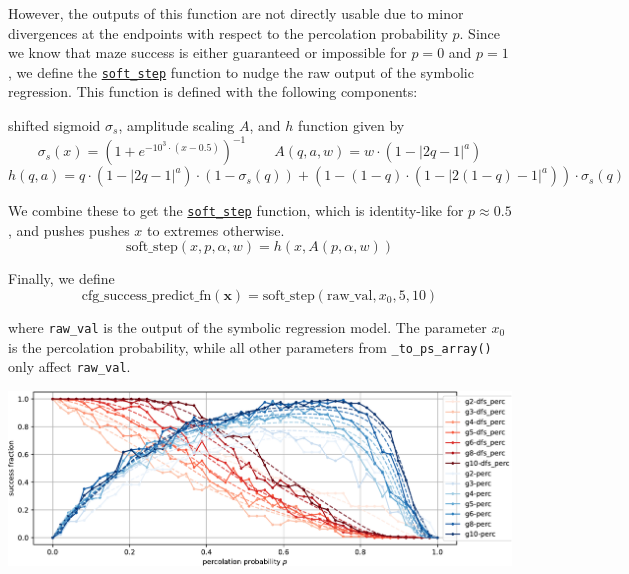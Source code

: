 \documentclass[10pt,a4paper,onecolumn]{article}
\let\origfigure\figure
\let\endorigfigure\endfigure
\renewenvironment{figure}[1][2] {
    \expandafter\origfigure\expandafter[H]
} {
    \endorigfigure
}
\begin{document}
However, the outputs of this function are not directly usable due to
minor divergences at the endpoints with respect to the percolation
probability \(p\). Since we know that maze success is either guaranteed
or impossible for \(p=0\) and \(p=1\), we define the
\href{https://understanding-search.github.io/maze-dataset/maze_dataset/dataset/success_predict_math.html\#soft_step}{\texttt{soft\_step}}
function to nudge the raw output of the symbolic regression. This
function is defined with the following components:

shifted sigmoid \(\sigma_s\), amplitude scaling \(A\), and \(h\)
function given by \[
  \sigma_s(x) = (1 + e^{-10^3 \cdot (x-0.5)})^{-1}
  \qquad A(q,a,w) = w \cdot (1 - |2q-1|^a)
\] \[
  h(q,a) = q \cdot (1 - |2q-1|^a) \cdot (1-\sigma_s(q)) + (1-(1-q) \cdot (1 - |2(1-q)-1|^a)) \cdot \sigma_s(q)
\]

We combine these to get the
\href{https://understanding-search.github.io/maze-dataset/maze_dataset/dataset/success_predict_math.html\#soft_step}{\texttt{soft\_step}}
function, which is identity-like for \(p \approx 0.5\), and pushes
pushes \(x\) to extremes otherwise. \[
  \text{soft\_step}(x, p, \alpha, w) = h(x, A(p, \alpha, w))
\]

Finally, we define \[
  \text{cfg\_success\_predict\_fn}(\mathbf{x}) = \text{soft\_step}(\text{raw\_val}, x_0, 5, 10)
\]

where \texttt{raw\_val} is the output of the symbolic regression model.
The parameter \(x_0\) is the percolation probability, while all other
parameters from \texttt{\_to\_ps\_array()} only affect
\texttt{raw\_val}.

\begin{figure}
\centering
\includegraphics[width=1\textwidth,height=\textheight]{figures/ep/ep_deadends_unique-crop.pdf}
\caption{An example of both empirical and predicted success rates as a
function of the percolation probability \(p\) for various maze sizes,
percolation with and without depth first search, and
\texttt{endpoint\_kwargs} requiring that both the start and end be in
unique dead ends. Empirical measures derived from a sample of 128 mazes.
More information can be found on the
\href{https://understanding-search.github.io/maze-dataset/benchmarks/}{benchmarks
page}.}
\end{figure}
\end{document}
